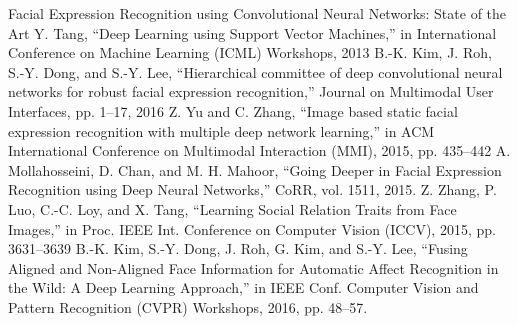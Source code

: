\begin{enumerate}
 Facial Expression Recognition using Convolutional Neural Networks: State of the Art
Y. Tang, “Deep Learning using Support Vector Machines,” in International Conference on Machine Learning (ICML) Workshops, 2013
B.-K. Kim, J. Roh, S.-Y. Dong, and S.-Y. Lee, “Hierarchical committee
of deep convolutional neural networks for robust facial expression
recognition,” Journal on Multimodal User Interfaces, pp. 1–17, 2016
Z. Yu and C. Zhang, “Image based static facial expression recognition
with multiple deep network learning,” in ACM International Conference
on Multimodal Interaction (MMI), 2015, pp. 435–442
 A. Mollahosseini, D. Chan, and M. H. Mahoor, “Going Deeper in Facial
Expression Recognition using Deep Neural Networks,” CoRR, vol. 1511,
2015.
Z. Zhang, P. Luo, C.-C. Loy, and X. Tang, “Learning Social Relation
Traits from Face Images,” in Proc. IEEE Int. Conference on Computer
Vision (ICCV), 2015, pp. 3631–3639
 B.-K. Kim, S.-Y. Dong, J. Roh, G. Kim, and S.-Y. Lee, “Fusing Aligned
and Non-Aligned Face Information for Automatic Affect Recognition in
the Wild: A Deep Learning Approach,” in IEEE Conf. Computer Vision
and Pattern Recognition (CVPR) Workshops, 2016, pp. 48–57.
\end{enumerate}
